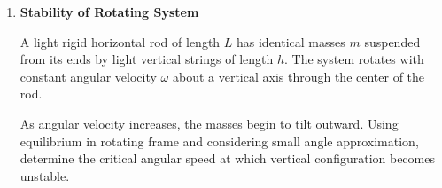 \documentclass[12pt]{article}
\begin{document}
\begin{enumerate}
A particle of charge $q$ and mass $m$ moves in a plane perpendicular to a uniform magnetic field $B$. In addition, a weak radial electric field $E(r)=\alpha r$ exists directed outward.

Assuming circular motion of radius $R$ and treating the electric field as a small perturbation, determine the modified angular frequency to first order in $\alpha$.

\begin{center}
\end{center}

A) $ \dfrac{qB}{m} $

B) $ \dfrac{qB}{m}+\dfrac{\alpha}{B} $

C) $ \dfrac{qB}{m}-\dfrac{\alpha}{B} $

D) $ \dfrac{qB}{m}+\dfrac{\alpha R}{B} $

\item \textbf{Stability of Rotating System} 

A light rigid horizontal rod of length $L$ has identical masses $m$ suspended from its ends by light vertical strings of length $h$. The system rotates with constant angular velocity $\omega$ about a vertical axis through the center of the rod.

As angular velocity increases, the masses begin to tilt outward. Using equilibrium in rotating frame and considering small angle approximation, determine the critical angular speed at which vertical configuration becomes unstable.



\begin{center}
\end{center}


\end{enumerate}
\end{document}
